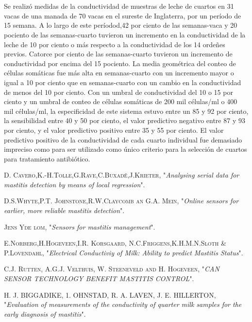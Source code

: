 \documentclass[a4paper, 11pt]{article}
\begin{document}
\section{\cite{2002}}
Se realizó medidas de la conductividad de muestras de leche de cuartos en 31 vacas de una manada de 70 vacas en el sureste de Inglaterra, por un período de 15 semana. A lo largo de este períodod,42 por ciento de las semanas-vaca y 20 pociento de las semanas-cuarto tuvieron un incremento en la conductividad de la leche de 10 por ciento o más respecto a la conductividad de los 14 ordeñes previos. Catorce por ciento de las semanas-cuarto tuvieron un incremento de conductividad por encima del 15 pociento. La media geométrica del conteo de células somáticas fue más alta en semanas-cuarto con un incremento mayor o igual a 10 por ciento que en semanas-cuarto con un cambio en la conductividad de menos del 10 por ciento. Con un umbral de conductividad del 10 o 15 por ciento y un umbral de conteo de células somáticas de 200 mil células/ml o 400 mil células/ml, la especificidad de este sistema estuvo entre un 85 y 92 por ciento, la sensibilidad entre 40 y 50 por ciento, el valor predictivo negativo entre 87 y 93 por ciento, y el valor predictivo positivo entre 35 y 55 por ciento.
El valor predictivo positivo de la conductividad de cada cuarto individual fue demasiado impreciso como para ser utilizado como único criterio para la selección de cuartos para tratamiento antibiótico.

\begin{thebibliography}{X}
	 \textsc{D. Cavero,K.-H.Tolle,G.Rave,C.Buxadé,J.Krieter}, "\textit{Analysing serial data for mastitis detection by means of local regression}". 
	
	 \textsc{D.S.Whyte,P.T. Johnstone,R.W.Claycomb an G.A. Mein}, "\textit{Online sensors for earlier, more reliable mastitis detection}".
	
	 \textsc{Jens Yde lom}, "\textit{Sensors for mastitis management}". 
	
	 \textsc{E.Norberg,H.Hogeveen,I.R. Korsgaard, N.C.Friggens,K.H.M.N.Sloth \& P.Lovendahl}, "\textit{Electrical Conductiviy of Milk: Ability to predict Mastitis Status}".
	
	 \textsc{C.J. Rutten, A.G.J. Velthuis, W. Steeneveld and H. Hogeveen}, "\textit{CAN SENSOR TECHNOLOGY BENEFIT MASTITIS CONTROL}".
	
	 \textsc{H. J. BIGGADIKE, 1. OHNSTAD, R. A. LAVEN, J. E. HILLERTON}, "\textit{Evaluation of measurements of the
		conductivity of quarter milk samples for the
		early diagnosis of mastitis}".
\end{thebibliography}
\end{document}
